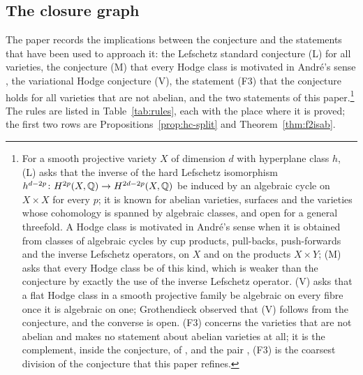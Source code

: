 \subsection{The closure graph}\label{ssec:graph}

The paper \cite{BMB26} records the implications between the conjecture and the statements that have been used to approach it: the Lefschetz standard conjecture (L) for all varieties, the conjecture (M) that every Hodge class is motivated in Andr\'e's sense \cite{And96b}, the variational Hodge conjecture (V), the statement (F3) that the conjecture holds for all varieties that are not abelian, and the two statements of this paper.\footnote{For a smooth projective variety $X$ of dimension $d$ with hyperplane class $h$, (L) asks that the inverse of the hard Lefschetz isomorphism $h^{d-2p}\colon H^{2p}(X,\mathbb{Q})\to H^{2d-2p}(X,\mathbb{Q})$ be induced by an algebraic cycle on $X\times X$ for every $p$; it is known for abelian varieties, surfaces and the varieties whose cohomology is spanned by algebraic classes, and open for a general threefold. A Hodge class is motivated in Andr\'e's sense when it is obtained from classes of algebraic cycles by cup products, pull-backs, push-forwards and the inverse Lefschetz operators, on $X$ and on the products $X\times Y$; (M) asks that every Hodge class be of this kind, which is weaker than the conjecture by exactly the use of the inverse Lefschetz operator. (V) asks that a flat Hodge class in a smooth projective family be algebraic on every fibre once it is algebraic on one; Grothendieck observed that (V) follows from the conjecture, and the converse is open. (F3) concerns the varieties that are not abelian and makes no statement about abelian varieties at all; it is the complement, inside the conjecture, of \Fii{}, and the pair \Fii{}, (F3) is the coarsest division of the conjecture that this paper refines.} The rules are listed in Table~\ref{tab:rules}, each with the place where it is proved; the first two rows are Propositions~\ref{prop:hc-split} and Theorem~\ref{thm:f2isab}.


